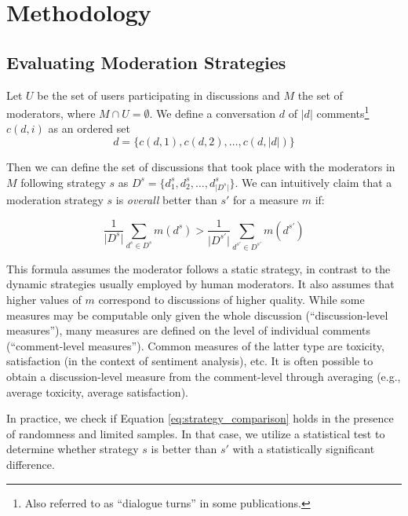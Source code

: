 %

\section{Methodology}
\label{sec:methodology}

\subsection{Evaluating Moderation Strategies}
\label{ssec:methodology:evaluating}

Let $U$ be the set of users participating in discussions and $M$ the set of moderators, where $M \cap U = \emptyset$. We define a conversation $d$ of $\lvert d \rvert$ comments\footnote{Also referred to as “dialogue turns” in some publications.} $c(d, i)$ as an ordered set 
\begin{equation}
    d = \{c(d, 1), c(d, 2), \ldots, c(d, \lvert d \rvert)\}
\end{equation}

Then we can define the set of discussions that took place with the moderators in $M$ following strategy $s$ as $D^{s} = \{d^s_1, d^s_2, \ldots, d^s_{\lvert D^s \rvert}\}$. We can intuitively claim that a moderation strategy $s$ is \textit{overall} better than $s'$ for a measure $m$ if:

\begin{equation}
\label{eq:strategy_comparison}
    \frac{1}{\lvert D^{s} \rvert} {\sum_{d^{s} \in D^{s}} m(d^{s})} > \frac{1}{\lvert D^{s'} \rvert} {\sum_{d^{s'} \in D^{s'}} m(d^{s'})}
\end{equation}

\noindent This formula assumes the moderator follows a static strategy, in contrast to the dynamic strategies usually employed by human moderators. It also assumes that higher values of $m$ correspond to discussions of higher quality. While some measures may be computable only given the whole discussion (“discussion-level measures”), many measures are defined on the level of individual comments (“comment-level measures”). Common measures of the latter type are toxicity, satisfaction (in the context of sentiment analysis), etc. It is often possible to obtain a discussion-level measure from the comment-level through averaging (e.g., average toxicity, average satisfaction).

In practice, we check if Equation \ref{eq:strategy_comparison} holds in the presence of randomness and limited samples. In that case, we utilize a statistical test to determine whether strategy $s$ is better than $s'$ with a statistically significant difference. 


